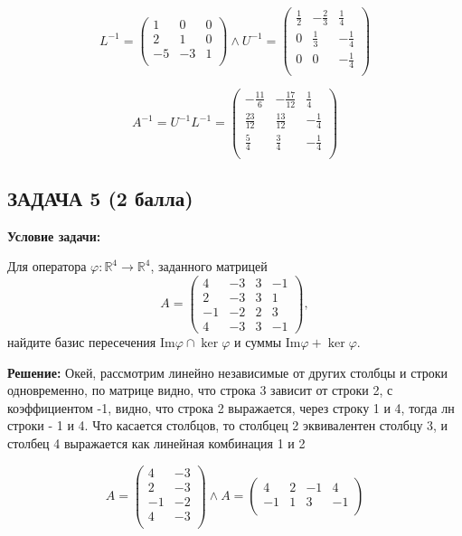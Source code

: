 \documentclass[a4paper,12pt]{article}
\begin{document}
\[
L^{-1} = 
\begin{pmatrix} 
    1 & 0 & 0\\
    2 & 1 & 0 \\
    -5 & -3 & 1 \\
\end{pmatrix} \land
U^{-1} = \begin{pmatrix}
\frac{1}{2} & -\frac{2}{3} & \frac{1}{4} \\
0 & \frac{1}{3} & -\frac{1}{4} \\
0 & 0 & -\frac{1}{4} \\
\end{pmatrix}
\]

\[
A^{-1} = U^{-1}L^{-1} = \begin{pmatrix}
-\frac{11}{6} & -\frac{17}{12} & \frac{1}{4} \\
\frac{23}{12} & \frac{13}{12} & -\frac{1}{4} \\
\frac{5}{4} & \frac{3}{4} & -\frac{1}{4} \\
\end{pmatrix}
\]

\vspace{1cm}

\subsection{ЗАДАЧА 5 \hfill \textbf{(2 балла)}}
\textbf{Условие задачи:}

Для оператора \( \varphi: \mathbb{R}^4 \to \mathbb{R}^4 \), заданного матрицей
\[
A =
\begin{pmatrix}
4 & -3 & 3 & -1 \\
2 & -3 & 3 & 1 \\
-1 & -2 & 2 & 3 \\
4 & -3 & 3 & -1
\end{pmatrix},
\]
найдите базис пересечения \( \text{Im} \varphi \cap \ker \varphi \) и суммы \( \text{Im} \varphi + \ker \varphi \).

\textbf{Решение:}
Окей, рассмотрим линейно независимые от других столбцы и строки одновременно, по матрице видно, что строка 3 зависит от строки 2, с коэффициентом -1, видно, что строка 2 выражается, через строку 1 и 4, тогда лн строки - 1 и 4. Что касается столбцов, то столбцец 2 эквивалентен столбцу 3, и столбец 4 выражается как линейная комбинация 1 и 2

\[
A = \begin{pmatrix}
    4 & -3 \\
    2 & -3 \\
    -1 & -2 \\
    4 & -3 \\
\end{pmatrix} \land

A = \begin{pmatrix}
    4 & 2 & -1 & 4 \\
    -1 & 1 & 3 & -1\\
\end{pmatrix}
\]
\end{document}

